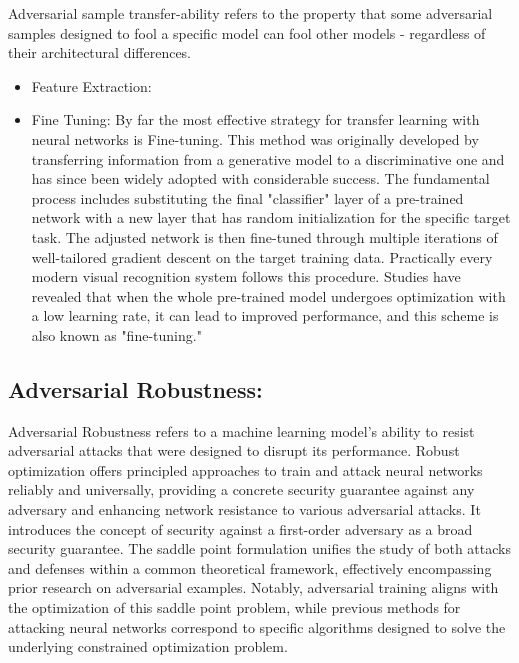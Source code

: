 \documentclass{article}
\begin{document}
\setlength{\parskip}{10pt}
\begingroup
\raggedright
Adversarial sample transfer-ability refers to the property that some adversarial samples designed to fool a specific model can fool other models - regardless of their architectural differences. \cite{goodfellow2015explaining}
\endgroup

\begin{itemize}
    \item
    Feature Extraction:
    

		
    \item
    Fine Tuning:
    By far the most effective strategy for transfer learning with neural networks is Fine-tuning.\cite{oquab2014learning} This method was originally developed by transferring information from a generative model to a discriminative one and has since been widely adopted with considerable success. The fundamental process includes substituting the final "classifier" layer of a pre-trained network with a new layer that has random initialization for the specific target task. The adjusted network is then fine-tuned through multiple iterations of well-tailored gradient descent on the target training data. Practically every modern visual recognition system follows this procedure. \cite{wang2019growing}
    Studies have revealed that when the whole pre-trained model undergoes optimization with a low learning rate, it can lead to improved performance, and this scheme is also known as "fine-tuning." \cite{chin2021renofeation}
\end{itemize}

\subsection{Adversarial Robustness:} 
Adversarial Robustness refers to a machine learning model’s ability to resist adversarial attacks that were designed to disrupt its performance. 
Robust optimization offers principled approaches to train and attack neural networks reliably and universally, providing a concrete security guarantee against any adversary and enhancing network resistance to various adversarial attacks. It introduces the concept of security against a first-order adversary as a broad security guarantee. The saddle point formulation unifies the study of both attacks and defenses within a common theoretical framework, effectively encompassing prior research on adversarial examples. Notably, adversarial training aligns with the optimization of this saddle point problem, while previous methods for attacking neural networks correspond to specific algorithms designed to solve the underlying constrained optimization problem. \cite{madry2017towards}
\end{document}
